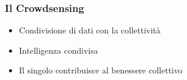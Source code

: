 \documentclass{beamer}
\begin{document}
\begin{frame}
\frametitle{Il Crowdsensing}
\begin{itemize}
  \item Condivisione di dati con la collettività
  \item Intelligenza condivisa
  \item Il singolo contribuisce al benessere collettivo
\end{itemize}
\end{frame}


\end{document}

